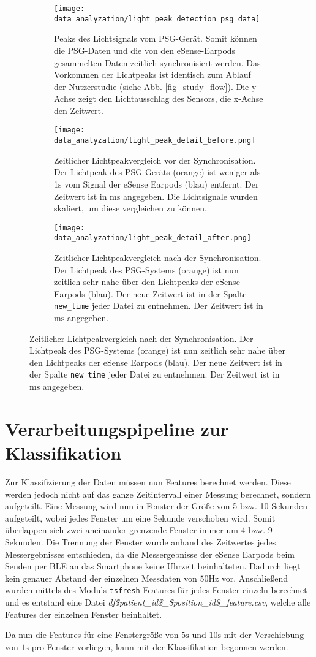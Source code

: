 \begin{figure}[ht]
  \centering
  \begin{subfigure}{0.66\textwidth}
    \texttt{[image: data\_analyzation/light\_peak\_detection\_psg\_data]}
    \caption{Peaks des Lichtsignals vom PSG-Gerät. Somit können die PSG-Daten und die von den eSense-Earpods gesammelten Daten zeitlich synchronisiert werden. Das Vorkommen der Lichtpeaks ist identisch zum Ablauf der Nutzerstudie (siehe Abb. \ref{fig_study_flow}). Die y-Achse zeigt den Lichtausschlag des Sensors, die x-Achse den Zeitwert.}
    \label{implementation:synchronisation:peaks_psg}
  \end{subfigure}
  \begin{subfigure}{.49\textwidth}
    \texttt{[image: data\_analyzation/light\_peak\_detail\_before.png]}
    \caption{Zeitlicher Lichtpeakvergleich vor der Synchronisation. Der Lichtpeak des PSG-Geräts (orange) ist weniger als 1s vom Signal der eSense Earpods (blau) entfernt. Der Zeitwert ist in $\si{\ms}$ angegeben. Die Lichtsignale wurden skaliert, um diese vergleichen zu können. }
    \label{implementation:synchronisation:before_light_peak}
  \end{subfigure}
  \begin{subfigure}{.49\textwidth}
    \texttt{[image: data\_analyzation/light\_peak\_detail\_after.png]}
    \caption{Zeitlicher Lichtpeakvergleich nach der Synchronisation. Der Lichtpeak des PSG-Systems (orange) ist nun zeitlich sehr nahe über den Lichtpeaks der eSense Earpods (blau). Der neue Zeitwert ist in der Spalte \texttt{new\_time} jeder Datei zu entnehmen. Der Zeitwert ist in $\si{\ms}$ angegeben.}
    \label{implementation:synchronisation:after_light_peak}
  \end{subfigure}
  \label{implementation:synchronisation:peaks}
\end{figure}

\newpage
\section{Verarbeitungspipeline zur Klassifikation}
\label{ch:Implementierung:classification_pipeline}
Zur Klassifizierung der Daten müssen nun Features berechnet werden. 
Diese werden jedoch nicht auf das ganze Zeitintervall einer Messung berechnet, sondern aufgeteilt.
Eine Messung wird nun in Fenster der Größe von 5 bzw. 10 Sekunden aufgeteilt, wobei jedes Fenster um eine Sekunde verschoben wird. 
Somit überlappen sich zwei aneinander grenzende Fenster immer um 4 bzw. 9 Sekunden. 
Die Trennung der Fenster wurde anhand des Zeitwertes jedes Messergebnisses entschieden, da die Messergebnisse der eSense Earpods beim Senden per BLE an das Smartphone keine Uhrzeit beinhalteten.
Dadurch liegt kein genauer Abstand der einzelnen Messdaten von $50\si{\hertz}$ vor. 
Anschließend wurden mittels des Moduls \texttt{tsfresh} Features für jedes Fenster einzeln berechnet und es entstand eine Datei \textit{df\$patient\_id\$\_\$position\_id\$\_feature.csv}, welche alle Features der einzelnen Fenster beinhaltet.

Da nun die Features für eine Fenstergröße von $5\si{\s}$ und $10\si{\s}$ mit der Verschiebung von $1\si{\s}$ pro Fenster vorliegen, kann mit der Klassifikation begonnen werden.